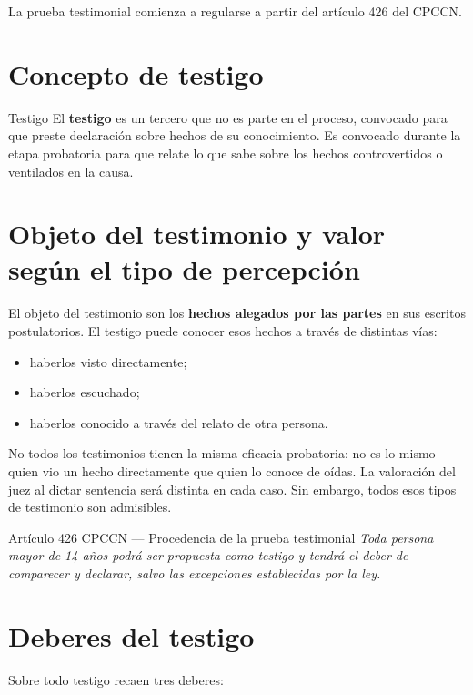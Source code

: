 \documentclass[12pt,oneside]{book}
\begin{document}
La prueba testimonial comienza a regularse a partir del artículo 426 del CPCCN.

\section{Concepto de testigo}

\begin{definition}{Testigo}
El \textbf{testigo} es un tercero que no es parte en el proceso, convocado para que preste declaración sobre hechos de su conocimiento. Es convocado durante la etapa probatoria para que relate lo que sabe sobre los hechos controvertidos o ventilados en la causa.
\end{definition}

\section{Objeto del testimonio y valor según el tipo de percepción}

El objeto del testimonio son los \textbf{hechos alegados por las partes} en sus escritos postulatorios. El testigo puede conocer esos hechos a través de distintas vías:
\begin{itemize}
    \item haberlos visto directamente;
    \item haberlos escuchado;
    \item haberlos conocido a través del relato de otra persona.
\end{itemize}

No todos los testimonios tienen la misma eficacia probatoria: no es lo mismo quien vio un hecho directamente que quien lo conoce de oídas. La valoración del juez al dictar sentencia será distinta en cada caso. Sin embargo, todos esos tipos de testimonio son admisibles.

\begin{norma}{Artículo 426 CPCCN --- Procedencia de la prueba testimonial}
\textit{Toda persona mayor de 14 años podrá ser propuesta como testigo y tendrá el deber de comparecer y declarar, salvo las excepciones establecidas por la ley.}
\end{norma}

\section{Deberes del testigo}

Sobre todo testigo recaen tres deberes:
\end{document}
